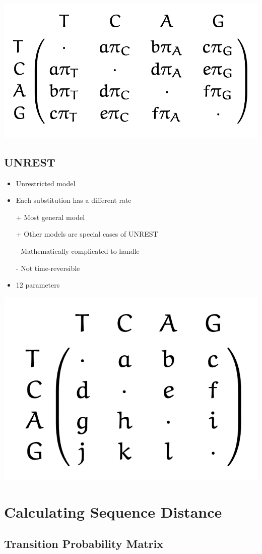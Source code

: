 \documentclass{article}
\begin{document}
\begin{multicols*}{3}
\begin{center}
    \includegraphics[width=0.7\linewidth]{GTR.png}
\end{center}
\subsection{UNREST}

\begin{itemize}
    \item Unrestricted model 
    \item Each substitution has a different rate
    \item[+] Most general model 
    \item[+] Other models are special cases of UNREST
    \item[-] Mathematically complicated to handle
    \item[-] Not time-reversible
    \item 12 parameters 
\end{itemize}

\begin{center}
    \includegraphics[width=0.5\linewidth]{unrest.png}
\end{center}

\section{Calculating Sequence Distance}
\subsection{Transition Probability Matrix}
\label{transprobmat}


\end{multicols*}
\end{document}
